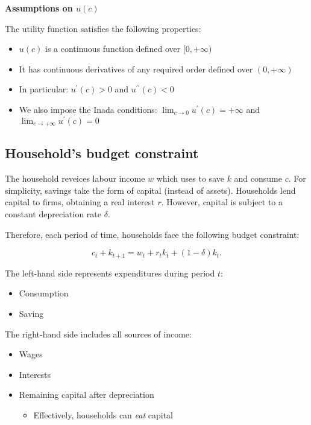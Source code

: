 \documentclass[11pt,a4paper,english]{article}
\providecommand{\tightlist}{%
  \setlength{\itemsep}{0pt}\setlength{\parskip}{0pt}}
\begin{document}
\textbf{Assumptions on \(u( c )\)}

The utility function satisfies the following properties:

\begin{itemize}
\tightlist
\item
  \(u( c )\) is a continuous function defined over \([0,+\infty)\)
\item
  It has continuous derivatives of any required order defined over
  \((0,+\infty)\)
\item
  In particular: \(u^{\prime}( c )>0\) and \(u^{\prime \prime}( c )<0\)
\item
  We also impose the Inada conditions:
  \(\lim_{c \rightarrow 0}u^{\prime}( c ) = +\infty\) and
  \(\lim_{c \rightarrow +\infty}u^{\prime}( c ) = 0\)
\end{itemize}

\hypertarget{households-budget-constraint}{%
\subsection{Household's budget
constraint}\label{households-budget-constraint}}

The household reveices labour income \(w\) which uses to save \(k\) and
consume \(c\). For simplicity, savings take the form of capital (instead
of assets). Households lend capital to firms, obtaining a real interest
\(r\). However, capital is subject to a constant depreciation rate
\(\delta\).

Therefore, each period of time, households face the following budget
constraint:

\[c_{t} + k_{t+1} = w_{t} + r_{t} k_{t} + (1-\delta) k_{t}.\]

The left-hand side represents expenditures during period \(t\):

\begin{itemize}
\tightlist
\item
  Consumption
\item
  Saving
\end{itemize}

The right-hand side includes all sources of income:

\begin{itemize}
\tightlist
\item
  Wages
\item
  Interests
\item
  Remaining capital after depreciation

  \begin{itemize}
  \tightlist
  \item
    Effectively, households can \emph{eat} capital
  \end{itemize}
\end{itemize}
\end{document}
